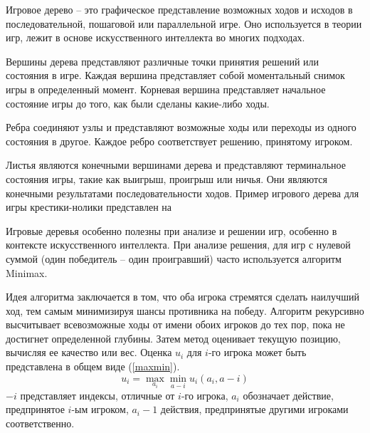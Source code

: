 Игровое дерево -- это графическое представление возможных ходов и исходов в последовательной, пошаговой или параллельной игре. Оно используется в теории игр, лежит в основе искусственного интеллекта во многих подходах.

Вершины дерева представляют различные точки принятия решений или состояния в игре. Каждая вершина представляет собой моментальный снимок игры в определенный момент. Корневая вершина представляет начальное состояние игры до того, как были сделаны какие-либо ходы.

Ребра соединяют узлы и представляют возможные ходы или переходы из одного состояния в другое. Каждое ребро соответствует решению, принятому игроком.

Листья являются конечными вершинами дерева и представляют терминальное состояния игры, такие как выигрыш, проигрыш или ничья. Они являются конечными результатами последовательности ходов. Пример игрового дерева для игры крестики-нолики представлен на 


Игровые деревья особенно полезны при анализе и решении игр, особенно в контексте искусственного интеллекта. При анализе решения, для игр с нулевой суммой (один победитель -- один проигравший) часто используется алгоритм Minimax.

Идея алгоритма заключается в том, что оба игрока стремятся сделать наилучший ход, тем самым минимизируя шансы противника на победу. Алгоритм рекурсивно высчитывает всевозможные ходы от имени обоих игроков до тех пор, пока не достигнет определенной глубины. Затем метод оценивает текущую позицию, вычисляя ее качество или вес. Оценка $u_i$ для $i$-го игрока может быть представлена в общем виде (\ref{maxmin}).
\begin{equation}\label{maxmin}
    u_i = \max_{a_i} \min_{a - i} u_i(a_i, a - i)
\end{equation}
$-i$ представляет индексы, отличные от $i$-го игрока, $a_i$ обозначает действие, предпринятое $i$-ым игроком, $a_i - 1$ действия, предпринятые другими игроками соответственно.
